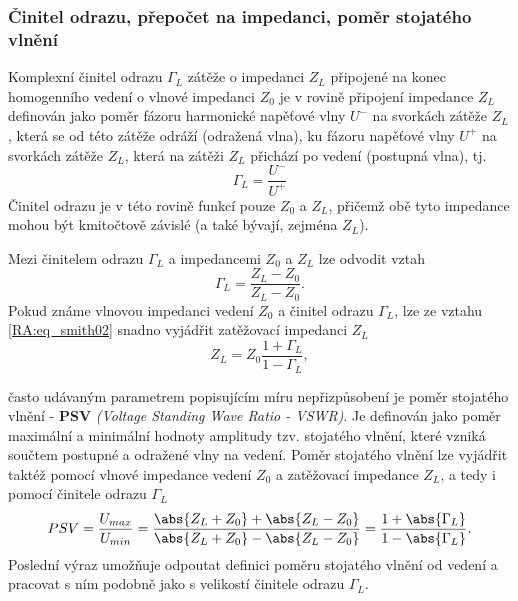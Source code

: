       \subsubsection{Činitel odrazu, přepočet na impedanci, poměr stojatého vlnění}
        Komplexní činitel odrazu \(\Gamma_L\) zátěže o impedanci \(Z_L\) připojené na konec 
        homogenního vedení o vlnové impedanci \(Z_0\) je v rovině připojení impedance \(Z_L\) 
        definován jako poměr fázoru harmonické napěťové vlny \(U^-\) na svorkách zátěže \(Z_L\), 
        která se od této zátěže odráží (odražená vlna), ku fázoru napěťové vlny \(U^+\) na svorkách 
        zátěže \(Z_L\), která na zátěži \(Z_L\) přichází po vedení (postupná vlna), tj.
        \begin{equation}\label{RA:eq_smith01}
          \Gamma_L = \frac{U^-}{U^+}
        \end{equation}
        Činitel odrazu je v této rovině funkcí pouze \(Z_0\) a \(Z_L\), přičemž obě tyto impedance 
        mohou být kmitočtově závislé (a také bývají, zejména \(Z_L\)).
  
        Mezi činitelem odrazu \(\Gamma_L\) a impedancemi \(Z_0\) a \(Z_L\) lze odvodit vztah
        \begin{equation}\label{RA:eq_smith02}
          \Gamma_L = \frac{Z_L-Z_0}{Z_L-Z_0}.
        \end{equation}    
        Pokud známe vlnovou impedanci vedení \(Z_0\) a činitel odrazu \(\Gamma_L\), lze ze vztahu 
        \ref{RA:eq_smith02} snadno vyjádřit zatěžovací impedanci \(Z_L\)
        \begin{equation}\label{RA:eq_smith03}
          Z_L = Z_0\frac{1+\Gamma_L}{1-\Gamma_L},
        \end{equation}    
  
        často udávaným parametrem popisujícím míru nepřizpůsobení je poměr stojatého vlnění - 
        \textbf{PSV} \emph{(Voltage Standing Wave Ratio - VSWR)}. Je definován jako poměr maximální 
        a minimální hodnoty amplitudy tzv. stojatého vlnění, které vzniká součtem postupné a 
        odražené vlny na vedení. Poměr stojatého vlnění lze vyjádřit taktéž pomocí vlnové impedance 
        vedení \(Z_0\) a zatěžovací impedance \(Z_L\), a tedy i pomocí činitele odrazu \(\Gamma_L\)
        \begin{equation}\label{RA:eq_smith04}
          PSV = \frac{U_{max}}{U_{min}} 
              = \frac{\abs{Z_L+Z_0} + \abs{Z_L-Z_0}}{\abs{Z_L+Z_0} - \abs{Z_L-Z_0}} 
              = \frac{1+\abs{\Gamma_L}}{1-\abs{\Gamma_L}}.
        \end{equation}
        Poslední výraz umožňuje odpoutat definici poměru stojatého vlnění od vedení a pracovat s 
        ním podobně jako s velikostí činitele odrazu \(\Gamma_L\).
      
